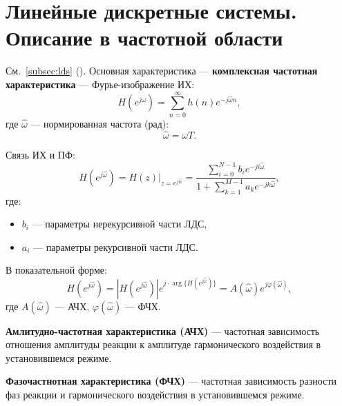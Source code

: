 \documentclass[a4paper, 14pt]{extarticle}
\begin{document}
\section{Линейные дискретные системы. Описание в частотной области}
См.~\ref{subsec:lds} ().
Основная характеристика --- \textbf{комплексная частотная характеристика} --- Фурье-изображение ИХ:
\begin{equation}\label{eq:complex_freq}
    H(e^{j \hat{ \omega }}) = \sum^{\infty}_{n=0} h(n) e^{-j \hat{ \omega } n},
\end{equation}
где $\hat{ \omega }$ --- нормированная частота (рад):
\begin{equation}
    \hat{ \omega } = \omega T.
\end{equation}

Связь ИХ и ПФ:
\begin{equation}
    H(e^{j \hat{ \omega }}) = H(z) \big\vert_{z=e^{j \hat{w}}} = \dfrac{ \sum\limits^{N-1}_{i=0} b_i e^{-ji \hat{ \omega }} }{1 + \sum\limits^{M-1}_{k=1} a_k e^{-jk \hat{ \omega }}},
\end{equation}
где:
\begin{itemize}
    \item $b_i$ --- параметры нерекурсивной части ЛДС,
    \item $a_i$ --- параметры рекурсивной части ЛДС.
\end{itemize}

В показательной форме:
\begin{equation}
    H(e^{j \hat{ \omega }}) = \left| H(e^{j \hat{ \omega }}) \right| e^{j \cdot \arg \{ H(e^{j \hat{ \omega }}) \} } = A(\hat{ \omega }) e^{j \varphi(\hat{ \omega })},
\end{equation}
где $A(\hat{ \omega })$ --- АЧХ, $\varphi( \hat{ \omega } )$ --- ФЧХ.

\textbf{Амлитудно-частотная характеристика (АЧХ)} --- частотная зависимость отношения амплитуды реакции к амплитуде гармонического воздействия в установившемся режиме.

\textbf{Фазочастнотная характеристика (ФЧХ)} --- частотная зависимость разности фаз реакции и гармонического воздействия в установившемся режиме.
\end{document}
